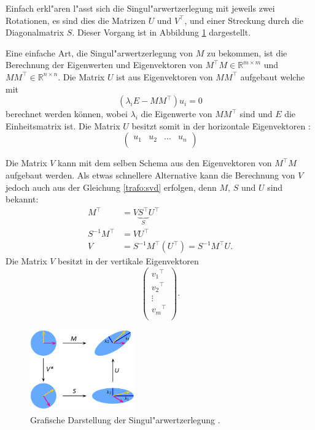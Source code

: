 \begin{refsection}
Einfach erkl"aren l"asst sich die Singul"arwertzerlegung mit jeweils zwei Rotationen, es sind dies die Matrizen $U$ und $V^\top$, und einer Streckung durch die Diagonalmatrix $S$. Dieser Vorgang ist in Abbildung \ref{trafo:SVDFig} dargestellt. 

Eine einfache Art, die Singul"arwertzerlegung von $M$ zu bekommen, ist die Berechnung der Eigenwerten und Eigenvektoren von $M^\top M \in \mathbb{R}^{m \times m}$ und $MM^\top \in \mathbb{R}^{n \times n}$. Die Matrix $U$ ist aus Eigenvektoren von $MM^\top$ aufgebaut welche mit
\begin{equation*}
	\left(\lambda_i E - MM^\top\right)u_i = 0
\end{equation*}
berechnet werden können, wobei $\lambda_i$ die Eigenwerte von $MM^\top$ sind und $E$ die Einheitsmatrix ist. Die Matrix $U$ besitzt somit in der horizontale Eigenvektoren \cite{trafo:Watkins}:
\begin{equation*}
	\left( 
		\begin{array}{cccc}
		u_1 & u_2 & \dots & u_n  \\		
		\end{array}
	\right)
\end{equation*}

Die Matrix $V$ kann mit dem selben Schema aus den Eigenvektoren von $M^\top M$ aufgebaut werden. Als etwas schnellere Alternative kann die Berechnung von $V$ jedoch auch aus der Gleichung \ref{trafo:svd} erfolgen, denn $M$, $S$ und $U$ sind bekannt:
\begin{align*}
	M^\top &= V \underbrace{S^\top}_{\displaystyle S} U^\top\\
	S^{-1} M^\top &= V U^\top\\
	V &= S^{-1} M^\top \left(U^\top\right) = S^{-1} M^\top U.
\end{align*}
Die Matrix $V$ besitzt in der vertikale Eigenvektoren  \cite{trafo:Watkins}
\begin{equation*}
	\left( 
		\begin{array}{c}
		{v_1}^{\top}\\
		{v_2}^{\top}\\
		\vdots\\
		{v_m}^{\top}\\			
		\end{array}
	\right).
\end{equation*}

\begin{figure}
	\centering
	\includegraphics[width=0.4\textwidth]{./trafo/images/svd.png}
	\caption{Grafische Darstellung der Singul"arwertzerlegung \cite{trafo:SVDWiki}.}
	\label{trafo:SVDFig}
\end{figure}


\end{refsection}
